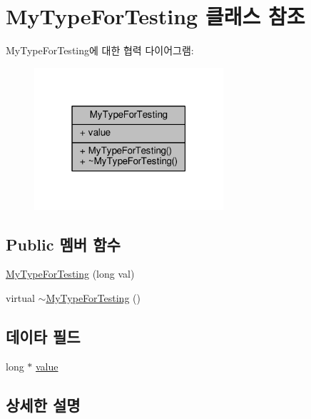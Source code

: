 \hypertarget{class_my_type_for_testing}{}\section{My\+Type\+For\+Testing 클래스 참조}
\label{class_my_type_for_testing}


My\+Type\+For\+Testing에 대한 협력 다이어그램\+:
\nopagebreak
\begin{figure}[H]
\begin{center}
\leavevmode
\includegraphics[width=199pt]{class_my_type_for_testing__coll__graph}
\end{center}
\end{figure}
\subsection*{Public 멤버 함수}
\begin{DoxyCompactItemize}
\item 
\hyperlink{class_my_type_for_testing_ac9f2fea0d292af1086909db5def3231d}{My\+Type\+For\+Testing} (long val)
\item 
virtual \hyperlink{class_my_type_for_testing_acda42b188bcb3b6eabec751249e12f8e}{$\sim$\+My\+Type\+For\+Testing} ()
\end{DoxyCompactItemize}
\subsection*{데이타 필드}
\begin{DoxyCompactItemize}
\item 
long $\ast$ \hyperlink{class_my_type_for_testing_ab6f550787dc33592efb2fcb6596fdd0f}{value}
\end{DoxyCompactItemize}


\subsection{상세한 설명}


